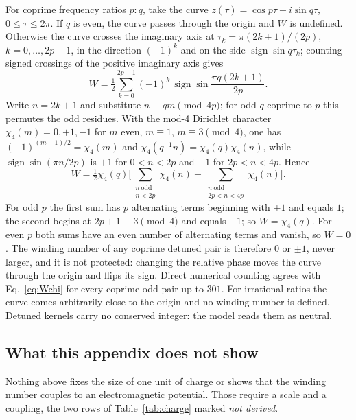 \documentclass[%
 reprint, amsmath,amssymb, aps, prb, ]{revtex4-2}
\numberwithin{equation}{section}
\begin{document}
For coprime frequency ratios $p:q$, take the curve $z(\tau)=\cos p\tau+i\sin q\tau$, $0\le\tau\le2\pi$. If $q$ is even, the curve passes through the origin and $W$ is undefined. Otherwise the curve crosses the imaginary axis at $\tau_k=\pi(2k+1)/(2p)$, $k=0,\dots,2p-1$, in the direction $(-1)^k$ and on the side $\operatorname{sign}\sin q\tau_k$; counting signed crossings of the positive imaginary axis gives
\begin{equation}
W=\tfrac12\sum_{k=0}^{2p-1}(-1)^k\,\operatorname{sign}\sin\frac{\pi q(2k+1)}{2p}.
\label{eq:Wsum}
\end{equation}
Write $n=2k+1$ and substitute $n\equiv qm\pmod{4p}$; for odd $q$ coprime to $p$ this permutes the odd residues. With the mod-4 Dirichlet character~\cite{ref:apostol} $\chi_4(m)=0,+1,-1$ for $m$ even, $m\equiv1$, $m\equiv3\pmod4$, one has $(-1)^{(m-1)/2}=\chi_4(m)$ and $\chi_4(q^{-1}n)=\chi_4(q)\chi_4(n)$, while $\operatorname{sign}\sin(\pi n/2p)$ is $+1$ for $0<n<2p$ and $-1$ for $2p<n<4p$. Hence
\begin{equation}
W=\tfrac12\chi_4(q)\Big[\sum_{\substack{n\ \mathrm{odd}\\ n<2p}}\chi_4(n)-\sum_{\substack{n\ \mathrm{odd}\\ 2p<n<4p}}\chi_4(n)\Big].
\label{eq:Wchi}
\end{equation}
For odd $p$ the first sum has $p$ alternating terms beginning with $+1$ and equals $1$; the second begins at $2p+1\equiv3\pmod4$ and equals $-1$; so $W=\chi_4(q)$. For even $p$ both sums have an even number of alternating terms and vanish, so $W=0$. The winding number of any coprime detuned pair is therefore $0$ or $\pm1$, never larger, and it is not protected: changing the relative phase moves the curve through the origin and flips its sign. Direct numerical counting agrees with Eq.~\eqref{eq:Wchi} for every coprime odd pair up to $301$. For irrational ratios the curve comes arbitrarily close to the origin and no winding number is defined. Detuned kernels carry no conserved integer: the model reads them as neutral.

\subsection{What this appendix does not show}

Nothing above fixes the size of one unit of charge or shows that the winding number couples to an electromagnetic potential. Those require a scale and a coupling, the two rows of Table~\ref{tab:charge} marked \emph{not derived}.
\end{document}
